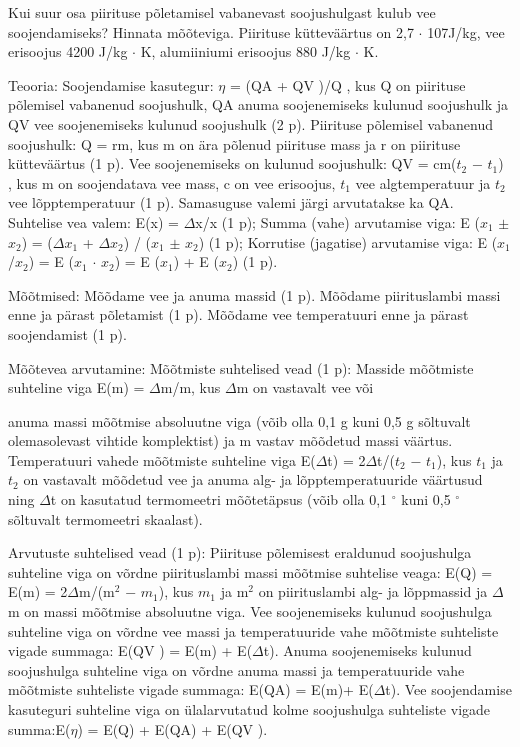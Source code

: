 
Kui suur osa piirituse põletamisel vabanevast soojushulgast kulub vee soojendamiseks? Hinnata mõõteviga. Piirituse kütteväärtus on 2,7 $\cdot$ 107J/kg, vee erisoojus 4200 J/kg $\cdot$ K, alumiiniumi erisoojus 880 J/kg $\cdot$ K.

\hint

\solu
Teooria: Soojendamise kasutegur: $\eta$ = (QA + QV )/Q , kus Q on piirituse põlemisel vabanenud soojushulk, QA anuma soojenemiseks kulunud soojushulk ja QV vee soojenemiseks kulunud soojushulk (2 p). Piirituse põlemisel vabanenud soojushulk: Q = rm, kus m on ära põlenud piirituse mass ja r on piirituse kütteväärtus (1 p). Vee soojenemiseks on kulunud soojushulk: QV = cm($t_2$ $-$ $t_1$) , kus m on soojendatava vee mass, c on vee erisoojus, $t_1$ vee algtemperatuur ja $t_2$ vee lõpptemperatuur (1 p). Samasuguse valemi järgi arvutatakse ka QA. Suhtelise vea valem: E(x) = $\Delta$x/x (1 p); Summa (vahe) arvutamise viga: E ($x_1$ $\pm$ $x_2$) = ($\Delta$$x_1$ + $\Delta$$x_2$) / ($x_1$ $\pm$ $x_2$) (1 p); Korrutise (jagatise) arvutamise viga: E ($x_1$/$x_2$) = E ($x_1$ $\cdot$ $x_2$) = E ($x_1$) + E ($x_2$) (1 p).

Mõõtmised: Mõõdame vee ja anuma massid (1 p). Mõõdame piirituslambi massi enne ja pärast põletamist (1 p). Mõõdame vee temperatuuri enne ja pärast soojendamist (1 p).

Mõõtevea arvutamine: Mõõtmiste suhtelised vead (1 p): Masside mõõtmiste suhteline viga E(m) = $\Delta$m/m, kus $\Delta$m on vastavalt vee või

anuma massi mõõtmise absoluutne viga (võib olla 0,1 g kuni 0,5 g sõltuvalt olemasolevast vihtide komplektist) ja m vastav mõõdetud massi väärtus. Temperatuuri vahede mõõtmiste suhteline viga E($\Delta$t) = 2$\Delta$t/($t_2$ $-$ $t_1$), kus $t_1$ ja $t_2$ on vastavalt mõõdetud vee ja anuma alg- ja lõpptemperatuuride väärtusud ning $\Delta$t on kasutatud termomeetri mõõtetäpsus (võib olla 0,1 $^\circ$ kuni 0,5 $^\circ$ sõltuvalt termomeetri skaalast).

Arvutuste suhtelised vead (1 p): Piirituse põlemisest eraldunud soojushulga suhteline viga on võrdne piirituslambi massi mõõtmise suhtelise veaga: E(Q) = E(m) = 2$\Delta$m/(m$^2$ $-$ $m_1$), kus $m_1$ ja m$^2$ on piirituslambi alg- ja lõppmassid ja $\Delta$m on massi mõõtmise absoluutne viga. Vee soojenemiseks kulunud soojushulga suhteline viga on võrdne vee massi ja temperatuuride vahe mõõtmiste suhteliste vigade summaga: E(QV ) = E(m) + E($\Delta$t). Anuma soojenemiseks kulunud soojushulga suhteline viga on võrdne anuma massi ja temperatuuride vahe mõõtmiste suhteliste vigade summaga: E(QA) = E(m)+ E($\Delta$t). Vee soojendamise kasuteguri suhteline viga on ülalarvutatud kolme soojushulga suhteliste vigade summa:E($\eta$) = E(Q) + E(QA) + E(QV ).
\probend
